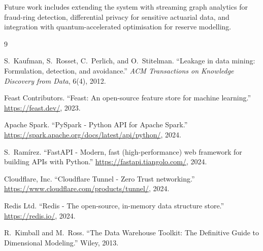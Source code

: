 \documentclass[11pt,a4paper]{article}
\begin{document}
Future work includes extending the system with streaming graph analytics for fraud-ring detection, differential privacy for sensitive actuarial data, and integration with quantum-accelerated optimisation for reserve modelling.

\begin{thebibliography}{9}

S.~Kaufman, S.~Rosset, C.~Perlich, and O.~Stitelman.
``Leakage in data mining: Formulation, detection, and avoidance.''
\textit{ACM Transactions on Knowledge Discovery from Data}, 6(4), 2012.

Feast Contributors.
``Feast: An open-source feature store for machine learning.''
\url{https://feast.dev/}, 2023.

Apache Spark.
``PySpark - Python API for Apache Spark.''
\url{https://spark.apache.org/docs/latest/api/python/}, 2024.

S.~Ram\'irez.
``FastAPI - Modern, fast (high-performance) web framework for building APIs with Python.''
\url{https://fastapi.tiangolo.com/}, 2024.

Cloudflare, Inc.
``Cloudflare Tunnel - Zero Trust networking.''
\url{https://www.cloudflare.com/products/tunnel/}, 2024.

Redis Ltd.
``Redis - The open-source, in-memory data structure store.''
\url{https://redis.io/}, 2024.

R.~Kimball and M.~Ross.
``The Data Warehouse Toolkit: The Definitive Guide to Dimensional Modeling.''
Wiley, 2013.

\end{thebibliography}
\end{document}
